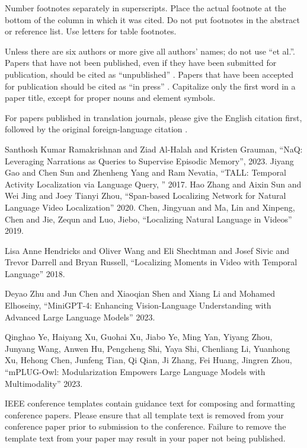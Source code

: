 \documentclass[conference]{IEEEtran}
\begin{document}
Number footnotes separately in superscripts. Place the actual footnote at 
the bottom of the column in which it was cited. Do not put footnotes in the 
abstract or reference list. Use letters for table footnotes.

Unless there are six authors or more give all authors' names; do not use 
``et al.''. Papers that have not been published, even if they have been 
submitted for publication, should be cited as ``unpublished'' \cite{b4}. Papers 
that have been accepted for publication should be cited as ``in press'' \cite{b5}. 
Capitalize only the first word in a paper title, except for proper nouns and 
element symbols.

For papers published in translation journals, please give the English 
citation first, followed by the original foreign-language citation \cite{b6}.

\begin{thebibliography}{00}
 Santhosh Kumar Ramakrishnan and Ziad Al-Halah and Kristen Grauman, ``NaQ: Leveraging Narrations as Queries to Supervise Episodic Memory'', 2023.
 Jiyang Gao and Chen Sun and Zhenheng Yang and Ram Nevatia, ``TALL: Temporal Activity Localization via Language Query, '' 2017.
 Hao Zhang and Aixin Sun and Wei Jing and Joey Tianyi Zhou, ``Span-based Localizing Network for Natural Language Video Localization'' 2020.
 Chen, Jingyuan and Ma, Lin and Xinpeng, Chen and Jie, Zequn and Luo, Jiebo, ``Localizing Natural Language in Videos'' 2019.

 Lisa Anne Hendricks and Oliver Wang and Eli Shechtman and Josef Sivic and Trevor Darrell and Bryan Russell, ``Localizing Moments in Video with Temporal Language'' 2018.

 Deyao Zhu and Jun Chen and Xiaoqian Shen and Xiang Li and Mohamed Elhoseiny, ``MiniGPT-4: Enhancing Vision-Language Understanding with Advanced Large Language Models'' 2023.

 Qinghao Ye, Haiyang Xu, Guohai Xu, Jiabo Ye, Ming Yan, Yiyang Zhou, Junyang Wang, Anwen Hu, Pengcheng Shi, Yaya Shi, Chenliang Li, Yuanhong Xu, Hehong Chen, Junfeng Tian, Qi Qian, Ji Zhang, Fei Huang, Jingren Zhou, ``mPLUG-Owl: Modularization Empowers Large Language Models with Multimodality'' 2023.



\end{thebibliography}
\vspace{12pt}
\color{red}
IEEE conference templates contain guidance text for composing and formatting conference papers. Please ensure that all template text is removed from your conference paper prior to submission to the conference. Failure to remove the template text from your paper may result in your paper not being published.
\end{document}
